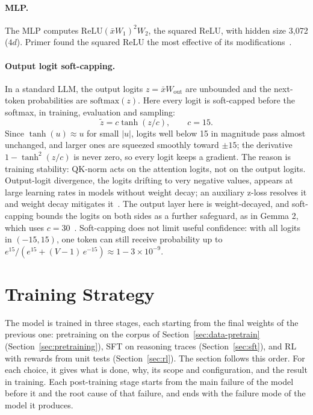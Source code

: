 \documentclass[sigconf,nonacm,balance=false]{acmart}
\begin{document}
\paragraph{MLP\@.} The MLP computes $\mathrm{ReLU}(\bar{x} W_1)^2 W_2$, the squared ReLU, with hidden size 3,072
($4d$). Primer found the squared ReLU the most effective of its modifications~\cite{so2021primer}.

\paragraph{Output logit soft-capping.} In a standard LLM, the output logits $z = \bar{x} W_{\mathrm{out}}$ are
unbounded and the next-token probabilities are $\mathrm{softmax}(z)$. Here every logit is soft-capped before the
softmax, in training, evaluation and sampling:
\[
  \tilde{z} = c \tanh(z / c), \qquad c = 15.
\]
Since $\tanh(u) \approx u$ for small $|u|$, logits well below 15 in magnitude pass almost unchanged, and larger ones
are squeezed smoothly toward $\pm 15$; the derivative $1 - \tanh^2(z/c)$ is never zero, so every logit keeps a
gradient. The reason is training stability: QK-norm acts on the attention logits, not on the output logits. Output-logit
divergence, the logits drifting to very negative values, appears at large learning rates in models without weight
decay; an auxiliary z-loss resolves it and weight decay mitigates it~\cite{wortsman2023smallscale}. The output layer
here is weight-decayed, and soft-capping bounds the logits
on both sides as a further safeguard, as in Gemma 2, which uses $c = 30$~\cite{gemma2024gemma2}. Soft-capping does not
limit useful confidence: with all logits in $(-15, 15)$, one token can still receive probability up to
$e^{15} / (e^{15} + (V - 1)\, e^{-15}) \approx 1 - 3 \times 10^{-9}$.

\section{Training Strategy}
\label{sec:training}

The model is trained in three stages, each starting from the final weights of the previous one: pretraining on the
corpus of Section~\ref{sec:data-pretrain} (Section~\ref{sec:pretraining}), SFT on reasoning traces
(Section~\ref{sec:sft}), and RL with rewards from unit tests (Section~\ref{sec:rl}). The section follows this order.
For each choice, it gives what is done, why, its scope and configuration, and the result in training. Each
post-training stage starts from the main failure of the model before it and the root cause of that failure, and ends
with the failure mode of the model it produces.
\end{document}
